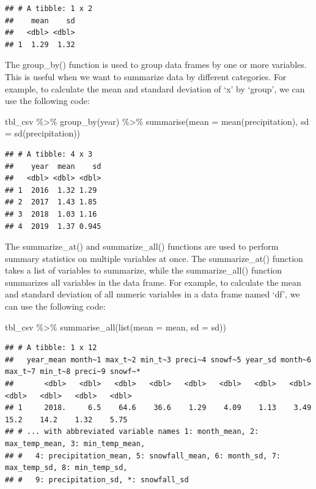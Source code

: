\documentclass[
]{book}
\newenvironment{Shaded}{\begin{snugshade}}{\end{snugshade}}
\newcommand{\AttributeTok}[1]{\textcolor[rgb]{0.77,0.63,0.00}{#1}}
\newcommand{\FunctionTok}[1]{\textcolor[rgb]{0.00,0.00,0.00}{#1}}
\newcommand{\NormalTok}[1]{#1}
\newcommand{\SpecialCharTok}[1]{\textcolor[rgb]{0.00,0.00,0.00}{#1}}
\begin{document}
\begin{verbatim}
## # A tibble: 1 x 2
##    mean    sd
##   <dbl> <dbl>
## 1  1.29  1.32
\end{verbatim}

The group\_by() function is used to group data frames by one or more variables. This is useful when we want to summarize data by different categories. For example, to calculate the mean and standard deviation of `x' by `group', we can use the following code:

\begin{Shaded}
\begin{Highlighting}[]
\NormalTok{tbl\_csv }\SpecialCharTok{\%\textgreater{}\%}
  \FunctionTok{group\_by}\NormalTok{(year) }\SpecialCharTok{\%\textgreater{}\%}
  \FunctionTok{summarise}\NormalTok{(}\AttributeTok{mean =} \FunctionTok{mean}\NormalTok{(precipitation), }
            \AttributeTok{sd =} \FunctionTok{sd}\NormalTok{(precipitation))}
\end{Highlighting}
\end{Shaded}

\begin{verbatim}
## # A tibble: 4 x 3
##    year  mean    sd
##   <dbl> <dbl> <dbl>
## 1  2016  1.32 1.29 
## 2  2017  1.43 1.85 
## 3  2018  1.03 1.16 
## 4  2019  1.37 0.945
\end{verbatim}

The summarize\_at() and summarize\_all() functions are used to perform summary statistics on multiple variables at once. The summarize\_at() function takes a list of variables to summarize, while the summarize\_all() function summarizes all variables in the data frame. For example, to calculate the mean and standard deviation of all numeric variables in a data frame named `df', we can use the following code:

\begin{Shaded}
\begin{Highlighting}[]
\NormalTok{tbl\_csv }\SpecialCharTok{\%\textgreater{}\%}
  \FunctionTok{summarise\_all}\NormalTok{(}\FunctionTok{list}\NormalTok{(}\AttributeTok{mean =}\NormalTok{ mean, }\AttributeTok{sd =}\NormalTok{ sd))}
\end{Highlighting}
\end{Shaded}

\begin{verbatim}
## # A tibble: 1 x 12
##   year_mean month~1 max_t~2 min_t~3 preci~4 snowf~5 year_sd month~6 max_t~7 min_t~8 preci~9 snowf~*
##       <dbl>   <dbl>   <dbl>   <dbl>   <dbl>   <dbl>   <dbl>   <dbl>   <dbl>   <dbl>   <dbl>   <dbl>
## 1     2018.     6.5    64.6    36.6    1.29    4.09    1.13    3.49    15.2    14.2    1.32    5.75
## # ... with abbreviated variable names 1: month_mean, 2: max_temp_mean, 3: min_temp_mean,
## #   4: precipitation_mean, 5: snowfall_mean, 6: month_sd, 7: max_temp_sd, 8: min_temp_sd,
## #   9: precipitation_sd, *: snowfall_sd
\end{verbatim}
\end{document}
